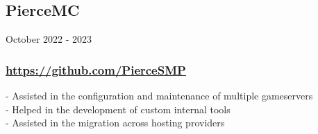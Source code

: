 \subsection{PierceMC} October 2022 - 2023 \\
\subsubsection{\href{https://github.com/PierceSMP}{https://github.com/PierceSMP}}
-\:  Assisted in the configuration and maintenance of multiple gameservers \\
-\:  Helped in the development of custom internal tools \\
-\:  Assisted in the migration across hosting providers \\







